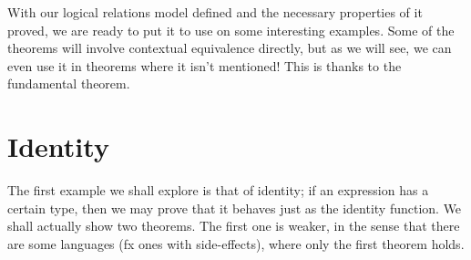 \documentclass[twoside,11pt,openright]{report}
\theoremstyle{definition}
\begin{document}
With our logical relations model defined and the necessary properties of it proved, we are ready to put it to use on some interesting examples. Some of the theorems will involve contextual equivalence directly, but as we will see, we can even use it in theorems where it isn't mentioned! This is thanks to the fundamental theorem.

\section{Identity}
The first example we shall explore is that of identity; if an expression has a certain type, then we may prove that it behaves just as the identity function.
We shall actually show two theorems. The first one is weaker, in the sense that there are some languages (fx ones with side-effects), where only the first theorem holds.
\end{document}
